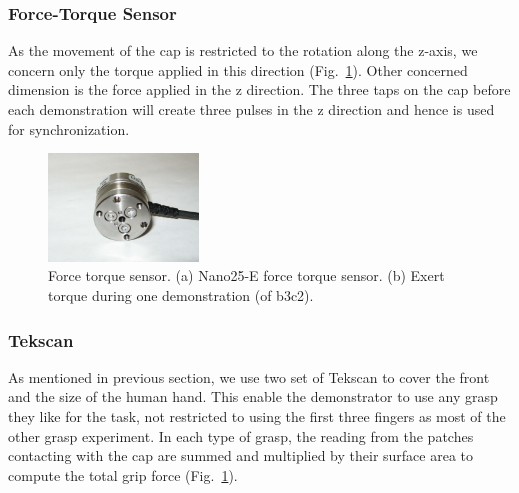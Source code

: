 \documentclass[preprint,12pt]{elsarticle}
\begin{document}
\subsubsection{Force-Torque Sensor}
\label{ftsensor}
As the movement of the cap is restricted to the rotation along the z-axis, we concern only the torque applied in this direction  (Fig.~\ref{fig:ftsensor}). Other concerned dimension is the force applied in the z direction. The three taps on the cap before each demonstration will create three pulses in the z direction and hence is used for synchronization.



\begin{figure}
  \centering
  \includegraphics[width=4cm]{./fig/Nano25-E.jpg}
  \vspace{0.2cm}
  \caption{ \scriptsize{Force torque sensor. (a) Nano25-E force torque sensor. (b) Exert torque during one demonstration (of b3c2). }
}
\label{fig:ftsensor}
\end{figure}

\subsubsection{Tekscan}
\label{tekscan}
As mentioned in previous section, we use two set of Tekscan to cover the front and the size of the human hand. This enable the demonstrator to use any grasp they like for the task, not restricted to using the first three fingers as most of the other grasp experiment. In each type of grasp, the reading from the patches contacting with the cap are summed and multiplied by their surface area to compute the total grip force (Fig.~\ref{fig:ftsensor}).
\end{document}
